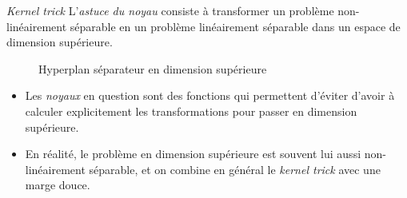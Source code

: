 \documentclass[hyperref={unicode}, xcolor={svgnames}, french]{beamer}
\begin{document}
\begin{frame}[fragile]{\emph{Kernel trick}}
    L'\emph{astuce du noyau} consiste à transformer un problème non-linéairement séparable en un problème linéairement séparable dans un espace de dimension supérieure.

    \begin{figure}
        \tikzset{external/export=true}
        \caption{Hyperplan séparateur en dimension supérieure}
    \end{figure}
    \vspace{-1\bigskipamount}
    \begin{overprint}
            \begin{itemize}
                \item Les \emph{noyaux} en question sont des fonctions qui permettent d'éviter d'avoir à calculer explicitement les transformations pour passer en dimension supérieure.
            \end{itemize}
            \begin{itemize}
                \item En réalité, le problème en dimension supérieure est souvent lui aussi non-linéairement séparable, et on combine en général le \emph{kernel trick} avec une marge douce.
            \end{itemize}
    \end{overprint}
\end{frame}
\end{document}

